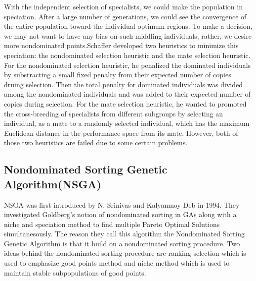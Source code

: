 With the independent selection of specialists, we could make the population in speciation. After a large number of generations, we could see the convergence of the entire population toward the individual optimum regions. To make a decision, we may not want to have any bias on such middling individuals, rather, we desire more nondominated points.Schaffer developed two heuristics to minimize this speciation: the nondominated selection heuristic and the mate selection heuristic. For the nondominated selection heuristic, he penalized the dominated individuals by substracting a small fixed penalty from their expected number of copies druing selection. Then the total penalty for dominated individuals was divided among the nondominated individuals and was added to their expected number of copies during selection. For the mate selection heuristic, he wanted to promoted the cross-breeding of specialists from different subgroups by selecting an individual, as a mate to a randomly selected individual, which has the maximum Euclidean distance in the performance space from its mate. However, both of those two heuristics are failed due to some certain problems.

\subsection{Nondominated Sorting Genetic Algorithm(NSGA)}
NSGA was first introduced by N. Srinivas and Kalyanmoy Deb in 1994\cite{NSGA_1994}. They investigated Goldberg's notion of nondominated sorting in GAs along with a niche and speciation method to find multiple Pareto Optimal Solutions simultanesously. The reason they call this algorithm the Nondominated Sorting Genetic Algorithm is that it build on a nondominated sorting procedure. Two ideas behind the nondominated sorting procedure are ranking selection which is used to emphasize good points method and niche method which is used to maintain stable subpopulations of good points.

